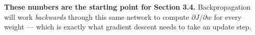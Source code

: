 \documentclass[12pt, a4paper]{article}
\begin{document}
\vspace{0.5em}

\begin{notebox}
  \textbf{These numbers are the starting point for Section 3.4.}
  Backpropagation will work \emph{backwards} through this same network to
  compute $\partial J / \partial w$ for every weight --- which is exactly what
  gradient descent needs to take an update step.
\end{notebox}
\end{document}
